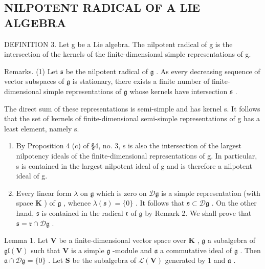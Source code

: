 \subsection{NILPOTENT RADICAL OF A LIE ALGEBRA}

DEFINITION 3. Let g be a Lie algebra. The nilpotent radical of g is the intersection of the kernels of the finite-dimensional simple representations of g.

Remarks. (1) Let \(\mathfrak{s}\) be the nilpotent radical of \(\mathfrak{g}\) . As every decreasing sequence of vector subspaces of \(\mathfrak{g}\) is stationary, there exists a finite number of finite-dimensional simple representations of \(\mathfrak{g}\) whose kernels have intersection \(\mathfrak{s}\) .

The direct sum of these representations is semi-simple and has kernel s. It follows that the set of kernels of finite-dimensional semi-simple representations of g has a least element, namely s.

\begin{enumerate}
\def\labelenumi{(\arabic{enumi})}
\setcounter{enumi}{1}
\item
  By Proposition 4 (c) of §4, no. 3, s is also the intersection of the largest nilpotency ideals of the finite-dimensional representations of g. In particular, s is contained in the largest nilpotent ideal of g and is therefore a nilpotent ideal of g.
\item
  Every linear form \(\lambda\) on \(\mathfrak{g}\) which is zero on \(\mathcal{D}\mathfrak{g}\) is a simple representation (with space \(\mathbf{K}\) ) of \(\mathfrak{g}\) , whence \(\lambda (\mathfrak{s}) = \{0\}\) . It follows that \(\mathfrak{s} \subset \mathcal{D}\mathfrak{g}\) . On the other hand, \(\mathfrak{s}\) is contained in the radical \(\mathfrak{r}\) of \(\mathfrak{g}\) by Remark 2. We shall prove that \(\mathfrak{s} = \mathfrak{r} \cap \mathcal{D}\mathfrak{g}\) .
\end{enumerate}

Lemma 1. Let \(\mathbf{V}\) be a finite-dimensional vector space over \(\mathbf{K}\) , \(\mathfrak{g}\) a subalgebra of \(\mathfrak{gl}(\mathbf{V})\) such that \(\mathbf{V}\) is a simple \(\mathfrak{g}\) -module and \(\mathfrak{a}\) a commutative ideal of \(\mathfrak{g}\) . Then \(\mathfrak{a} \cap \mathcal{D}\mathfrak{g} = \{0\}\) . Let \(\mathbf{S}\) be the subalgebra of \(\mathcal{L}(\mathbf{V})\) generated by 1 and \(\mathfrak{a}\) .

